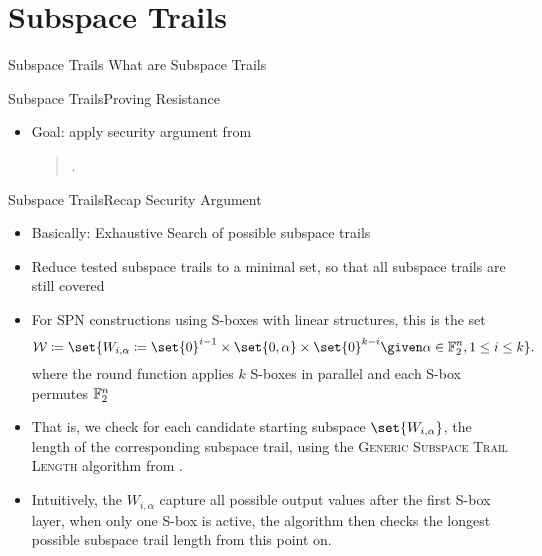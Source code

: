 \section{Subspace Trails}
\begin{frame}{Subspace Trails}
    What are Subspace Trails
\end{frame}

\begin{frame}{Subspace Trails}{Proving Resistance}
    \begin{itemize}
        \item Goal: apply security argument from
              \begin{quote}
                  .
              \end{quote}
    \end{itemize}
\end{frame}

\begin{frame}{Subspace Trails}{Recap Security Argument}
    \begin{itemize}
        \item Basically: Exhaustive Search of possible subspace trails
        \item Reduce tested subspace trails to a minimal set, so that all subspace trails are still covered
        \item For SPN constructions using S-boxes with linear structures, this is the set
              \begin{equation*}
                  \mathcal{W} \coloneqq \set{W_{i,\alpha} \coloneqq \set{0}^{i-1} \times \set{0,\alpha} \times \set{0}^{k-i} \given \alpha \in \F_2^n, 1 \leq i \leq k}.
              \end{equation*}
              where the round function applies $k$ S-boxes in parallel and each S-box permutes $\mathbb{F}_2^n$
        \item That is, we check for each candidate starting subspace $\set{W_{i,\alpha}}$, the length of the corresponding subspace trail, using the \textsc{Generic Subspace Trail Length} algorithm from \textcite{ToSC:LeaTezWie18}.
        \item Intuitively, the $W_{i,\alpha}$ capture all possible output values after the first S-box layer, when only one S-box is active, the algorithm then checks the longest possible subspace trail length from this point on.
    \end{itemize}
\end{frame}

